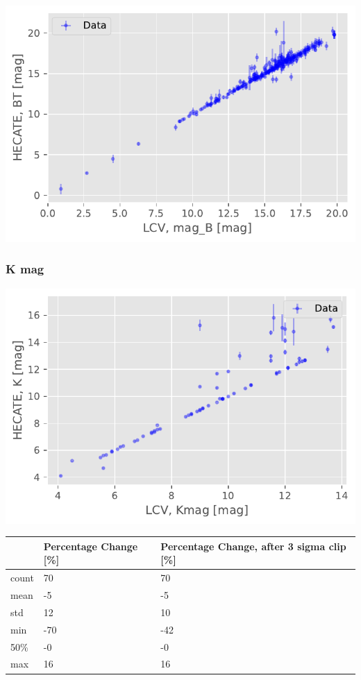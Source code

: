 \documentclass[
]{article}
\begin{document}
\includegraphics{compare_files/figure-pdf/cell-39-output-1.pdf}

\subsubsection{K mag}

\includegraphics{compare_files/figure-pdf/cell-40-output-1.pdf}

\begin{longtable}[]{@{}lll@{}}
\toprule\noalign{}
& Percentage Change {[}\%{]} & Percentage Change, after 3 sigma clip
{[}\%{]} \\
\midrule\noalign{}
\endhead
\bottomrule\noalign{}
\endlastfoot
count & 70 & 70 \\
mean & -5 & -5 \\
std & 12 & 10 \\
min & -70 & -42 \\
50\% & -0 & -0 \\
max & 16 & 16 \\
\end{longtable}
\end{document}
